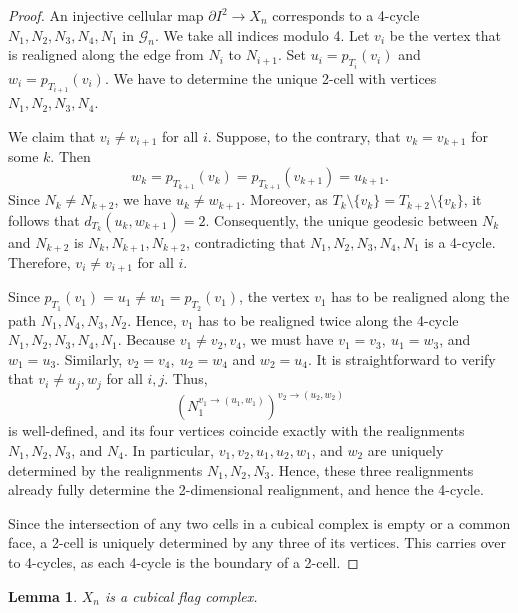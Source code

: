 \documentclass[reqno,dvipsnames]{amsart}
\theoremstyle{plain}
\newtheorem{lemma}[theorem]{Lemma}
\numberwithin{equation}{section}
\theoremstyle{definition}
\begin{document}
		\begin{proof}
			An injective cellular map $\partial I^2\to X_n$ corresponds to a 4-cycle $N_1,N_2,N_3,N_4, N_1$ in $\mathcal{G}_n$. We take all indices modulo 4. Let $v_i$ be the vertex that is realigned along the edge from $N_i$ to $N_{i+1}$. Set $u_i = p_{T_i}(v_i)$ and $w_i = p_{T_{i+1}} (v_i)$. We have to determine the unique 2-cell with vertices $N_1,N_2,N_3,N_4$.

			We claim that $v_i \neq v_{i+1}$ for all $i$. Suppose, to the contrary, that $v_k = v_{k+1}$ for some $k$. Then 
			\[
				w_k = p_{T_{k+1}}(v_k) = p_{T_{k+1}}(v_{k+1}) = u_{k+1}.
			\] 
			Since $N_k \neq N_{k+2}$, we have $u_k \neq w_{k+1}$. Moreover, as $T_k\setminus\{v_k\} = T_{k+2}\setminus \{v_k\}$, it follows that $d_{T_k}(u_k, w_{k+1}) = 2$. Consequently, the unique geodesic between $N_k$ and $N_{k+2}$ is $N_k, N_{k+1}, N_{k+2}$, contradicting that $N_1,N_2,N_3,N_4,N_1$ is a 4-cycle. Therefore, $v_i\neq v_{i+1}$ for all $i$.

			Since $p_{T_1}(v_1) = u_1 \neq w_1 = p_{T_2}(v_1)$, the vertex $v_1$ has to be realigned along the path $N_1, N_4, N_3, N_2$. Hence, $v_1$ has to be realigned twice along the 4-cycle $N_1,N_2,N_3,N_4, N_1$. Because $v_1\neq v_2,v_4$, we must have $v_1 = v_3, \> u_1 = w_3$, and $w_1 = u_3$. Similarly, $v_2 = v_4, \> u_2 = w_4$ and $w_2 = u_4$. It is straightforward to verify that $v_i \neq u_j,w_j$ for all $i,j$. Thus, 
			\[
				(N_1^{v_1\to (u_1,w_1)})^{v_2\to (u_2,w_2)}
			\] 
			is well-defined, and its four vertices coincide exactly with the realignments $N_1,N_2,N_3$, and $N_4$. In particular, $v_1,v_2,u_1,u_2,w_1$, and $w_2$ are uniquely determined by the realignments $N_1,N_2,N_3$. Hence, these three realignments already fully determine the 2-dimensional realignment, and hence the 4-cycle.

			Since the intersection of any two cells in a cubical complex is empty or a common face, a 2-cell is uniquely determined by any three of its vertices. This carries over to 4-cycles, as each 4-cycle is the boundary of a 2-cell.
		\end{proof}

		\begin{lemma} \label{lem:FlagComplex}
			$X_n$ is a cubical flag complex.
		\end{lemma}
\end{document}
